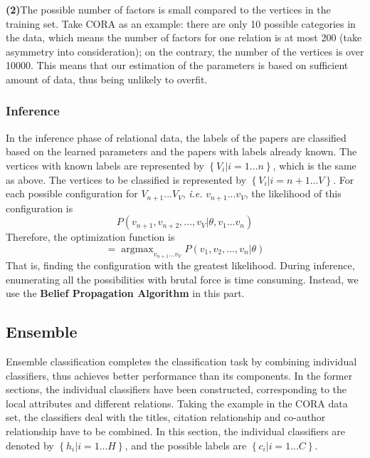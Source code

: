 \documentclass{sig-alternate}
\begin{document}
\textbf{(2)}The possible number of factors is small compared to the vertices in the training set. Take CORA as an example: there are only 10 possible categories in the data, which means the number of factors for one relation is at most 200 (take asymmetry into consideration); on the contrary, the number of the vertices is over 10000. This means that our estimation of the parameters is based on sufficient amount of data, thus being unlikely to overfit.

\subsubsection{Inference}
In the inference phase of relational data, the labels of the papers are classified based on the learned parameters and the papers with labels already known. The vertices with known labels are represented by $\left \{ V_{i}|i=1...n \right \}$, which is the same as above. The vertices to be classified is represented by $\left \{ V_{i}|i=n+1...V \right \}$. For each possible configuration for $V_{n+1}...V_{V}$, \emph{i.e.} $v_{n+1}...v_{V}$, the likelihood of this configuration is \begin{displaymath}P(v_{n+1},v_{n+2},...,v_V|\theta,v_{1}...v_{n})\end{displaymath} Therefore, the optimization function is \begin{displaymath}[v_{n+1},...,v_{V}]=\mathop{\arg\max}_{v_{n+1}...v_{V}}P(v_1,v_2,...,v_n|\theta)\end{displaymath} That is, finding the configuration with the greatest likelihood. During inference, enumerating all the possibilities with brutal force is time consuming. Instead, we use the \textbf{Belief Propagation Algorithm} in this part.

\subsection{Ensemble}
Ensemble classification completes the classification task by combining individual classifiers, thus achieves better performance than its components. In the former sections, the individual classifiers have been constructed, corresponding to the local attributes and different relations. Taking the example in the CORA data set, the classifiers deal with the titles, citation relationship and co-author relationship have to be combined. In this section, the individual classifiers are denoted by $\left\{ h_{i}|i=1...H \right\}$, and the possible labels are $\left\{ c_{i}|i=1...C \right\}$.
\end{document}
